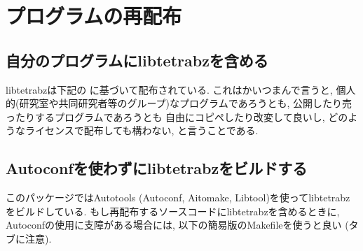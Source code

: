 \documentclass[letterpaper,10pt,dvipdfmx,openany]{sphinxmanual}
\begin{document}
\sphinxstepscope


\chapter{プログラムの再配布}
\label{\detokenize{copy:id1}}\label{\detokenize{copy::doc}}

\section{自分のプログラムにlibtetrabzを含める}
\label{\detokenize{copy:libtetrabz}}
\sphinxAtStartPar
libtetrabzは下記の {\hyperref[\detokenize{copy:mitlicense}]{}} に基づいて配布されている.
これはかいつまんで言うと,
個人的(研究室や共同研究者等のグループ)なプログラムであろうとも,
公開したり売ったりするプログラムであろうとも
自由にコピペしたり改変して良いし,
どのようなライセンスで配布しても構わない, と言うことである.


\section{Autoconfを使わずにlibtetrabzをビルドする}
\label{\detokenize{copy:autoconflibtetrabz}}
\sphinxAtStartPar
このパッケージではAutotools (Autoconf, Aitomake, Libtool)を使ってlibtetrabzをビルドしている.
もし再配布するソースコードにlibtetrabzを含めるときに,
Autoconfの使用に支障がある場合には, 以下の簡易版のMakefileを使うと良い (タブに注意).
\end{document}
